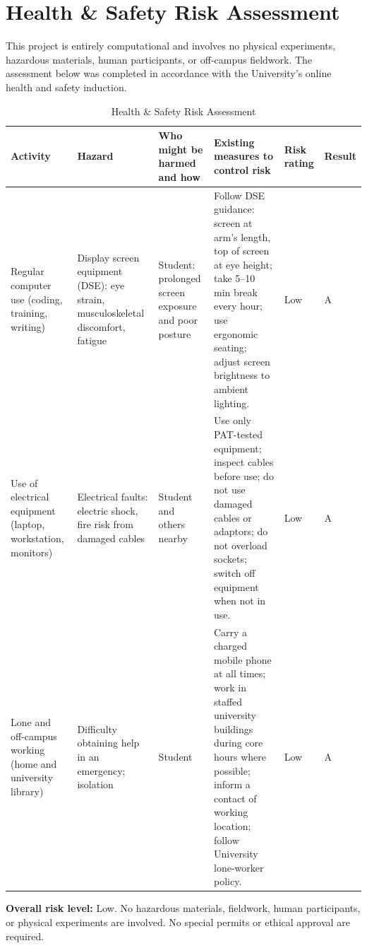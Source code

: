 \section{Health \& Safety Risk Assessment}
\label{app:hs}

This project is entirely computational and involves no physical experiments, hazardous materials, human participants, or off-campus fieldwork. The assessment below was completed in accordance with the University's online health and safety induction.

\begin{table}[H]
\centering
\caption{Health \& Safety Risk Assessment}
\label{tab:hs_risk}
\small
\begin{tabularx}{\textwidth}{p{2.4cm} p{2.2cm} p{2.0cm} X p{1.1cm} p{0.8cm}}
\toprule
\textbf{Activity} & \textbf{Hazard} & \textbf{Who might be harmed and how} & \textbf{Existing measures to control risk} & \textbf{Risk rating} & \textbf{Result} \\
\midrule
Regular computer use (coding, training, writing)
& Display screen equipment (DSE): eye strain, musculoskeletal discomfort, fatigue
& Student: prolonged screen exposure and poor posture
& Follow DSE guidance: screen at arm's length, top of screen at eye height; take 5--10 min break every hour; use ergonomic seating; adjust screen brightness to ambient lighting.
& Low & A \\
\midrule
Use of electrical equipment (laptop, workstation, monitors)
& Electrical faults: electric shock, fire risk from damaged cables
& Student and others nearby
& Use only PAT-tested equipment; inspect cables before use; do not use damaged cables or adaptors; do not overload sockets; switch off equipment when not in use.
& Low & A \\
\midrule
Lone and off-campus working (home and university library)
& Difficulty obtaining help in an emergency; isolation
& Student
& Carry a charged mobile phone at all times; work in staffed university buildings during core hours where possible; inform a contact of working location; follow University lone-worker policy.
& Low & A \\
\bottomrule
\end{tabularx}
\end{table}

\noindent\textbf{Overall risk level:} Low. No hazardous materials, fieldwork, human participants, or physical experiments are involved. No special permits or ethical approval are required.
